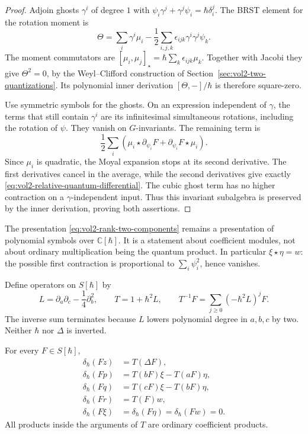 \begin{proof}
Adjoin ghosts $\gamma^i$ of degree $1$ with
$\psi_i\gamma^j+\gamma^j\psi_i=\hbar\delta_i^j$.
The BRST element for the rotation moment is
\[
 \Theta=\sum_i\gamma^i\mu_i
  -\frac12\sum_{i,j,k}\epsilon_{ijk}\gamma^i\gamma^j\psi_k.
\]
The moment commutators are
$[\mu_i,\mu_j]_\star=\hbar\sum_k\epsilon_{ijk}\mu_k$.
Together with Jacobi they give $\Theta^2=0$, by the
Weyl--Clifford construction of
Section~\ref{sec:vol2-two-quantizations}.
Its polynomial inner derivation $[\Theta,-]/\hbar$ is therefore
square-zero.

Use symmetric symbols for the ghosts. On an expression independent
of $\gamma$, the terms that still contain $\gamma^i$ are its
infinitesimal simultaneous rotations, including the rotation of
$\psi$. They vanish on $G$-invariants. The remaining term is
\[
 \frac12\sum_i\left(
      \mu_i\star\partial_{\psi_i}F
        +\partial_{\psi_i}F\star\mu_i\right).
\]
Since $\mu_i$ is quadratic, the Moyal expansion stops at its second
derivative. The first derivatives cancel in the average, while
the second derivatives give exactly
\eqref{eq:vol2-relative-quantum-differential}.
The cubic ghost term has no higher contraction on a
$\gamma$-independent input. Thus this invariant subalgebra is
preserved by the inner derivation, proving both assertions.
\end{proof}

The presentation \eqref{eq:vol2-rank-two-components} remains a
presentation of polynomial symbols over $\mathbb C[\hbar]$.
It is a statement about coefficient modules, not about ordinary
multiplication being the quantum product. In particular
$\xi\star\eta=w$: the possible first contraction is proportional
to $\sum_i\psi_i^2$, hence vanishes.

Define operators on $S[\hbar]$ by
\begin{equation}\label{eq:vol2-rank-two-coefficient-operator}
 L=\partial_a\partial_c-\frac14\partial_b^2,\qquad
 T=1+\hbar^2L,\qquad
 T^{-1}F=\sum_{j\geq0}(-\hbar^2L)^jF.
\end{equation}
The inverse sum terminates because $L$ lowers polynomial degree
in $a,b,c$ by two. Neither $\hbar$ nor $\Delta$ is inverted.

\begin{lemma}\label{lem:vol2-rank-two-quantum-coefficients}
For every $F\in S[\hbar]$,
\begin{equation}\label{eq:vol2-rank-two-quantum-coefficients}
 \begin{aligned}
 \delta_\hbar(Fz)&=T(\Delta F),\\
 \delta_\hbar(Fp)&=T(bF)\xi-T(aF)\eta,\\
 \delta_\hbar(Fq)&=T(cF)\xi-T(bF)\eta,\\
 \delta_\hbar(Fr)&=T(F)w,\\
 \delta_\hbar(F\xi)&=\delta_\hbar(F\eta)
                  =\delta_\hbar(Fw)=0.
 \end{aligned}
\end{equation}
All products inside the arguments of $T$ are ordinary coefficient
products.
\end{lemma}

